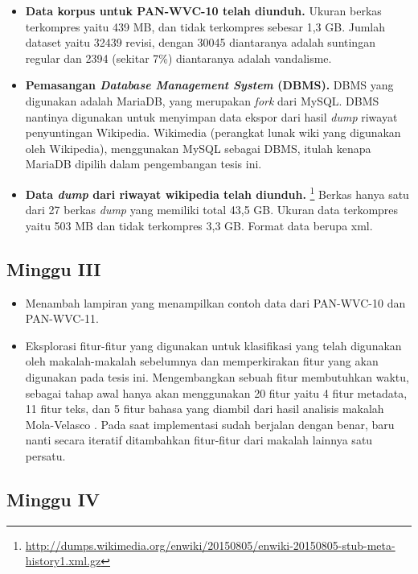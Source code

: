\begin{itemize}
	\item \textbf{Data korpus untuk PAN-WVC-10 telah diunduh.}
Ukuran berkas terkompres yaitu 439 MB, dan tidak terkompres sebesar 1,3 GB.
Jumlah dataset yaitu 32439 revisi, dengan 30045 diantaranya adalah suntingan regular dan 2394 (sekitar 7\%) diantaranya adalah vandalisme.

	\item \textbf{Pemasangan \textit{Database Management System} (DBMS).}
DBMS yang digunakan adalah MariaDB, yang merupakan \textit{fork} dari MySQL.
DBMS nantinya digunakan untuk menyimpan data ekspor dari hasil \textit{dump} riwayat penyuntingan Wikipedia.
Wikimedia (perangkat lunak wiki yang digunakan oleh Wikipedia), menggunakan MySQL sebagai DBMS, itulah kenapa MariaDB dipilih dalam pengembangan tesis ini.

	\item \textbf{Data \textit{dump} dari riwayat wikipedia telah diunduh.} \footnote{\RaggedRight\url{http://dumps.wikimedia.org/enwiki/20150805/enwiki-20150805-stub-meta-history1.xml.gz}}
Berkas hanya satu dari 27 berkas \textit{dump} yang memiliki total 43,5 GB.
Ukuran data terkompres yaitu 503 MB dan tidak terkompres 3,3 GB.
Format data berupa xml.
\end{itemize}

\subsection{Minggu III}

\begin{itemize}
	\item Menambah lampiran yang menampilkan contoh data dari PAN-WVC-10 dan PAN-WVC-11.
	\item Eksplorasi fitur-fitur yang digunakan untuk klasifikasi yang telah digunakan oleh makalah-makalah sebelumnya dan memperkirakan fitur yang akan digunakan pada tesis ini.
Mengembangkan sebuah fitur membutuhkan waktu, sebagai tahap awal hanya akan menggunakan 20 fitur yaitu 4 fitur metadata, 11 fitur teks, dan 5 fitur bahasa yang diambil dari hasil analisis makalah Mola-Velasco \cite{mola2012wikipedia}. Pada saat implementasi sudah berjalan dengan benar, baru nanti secara iteratif ditambahkan fitur-fitur dari makalah lainnya satu persatu.
\end{itemize}

\subsection{Minggu IV}


